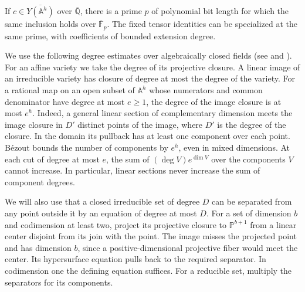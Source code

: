 \begin{lemma}\label{lem:descent-prime}
If $c\in\overline{Y(\mathbb A^h)}$ over $\overline{\mathbb Q}$, there is a
prime $p$ of polynomial bit length for which the same inclusion holds over
$\overline{\mathbb F}_p$. The fixed tensor identities can be specialized
at the same prime, with coefficients of bounded extension degree.
\end{lemma}

We use the following degree estimates over algebraically closed fields
(see \cite[Ch.~I, \S7]{Hartshorne} and
\cite[Lemma~2 and Proposition~3]{Heintz}).
For an affine variety we take the degree of its projective closure.
A linear image of an irreducible variety has closure of degree at most
the degree of the variety. For a rational map on an open subset of
$\mathbb A^h$ whose numerators and common denominator have degree at most
$e\ge1$, the degree of the image closure is at most $e^h$. Indeed, a
general linear section of complementary dimension meets the image closure
in $D'$ distinct points of the image, where $D'$ is the degree of the
closure. In the domain its pullback has at least one component over
each point. B\'ezout bounds the number
of components by $e^h$, even in mixed dimensions. At each cut of degree
at most $e$, the sum of $(\deg V)e^{\dim V}$ over the components $V$
cannot increase. In particular, linear sections never increase the sum
of component degrees.

We will also use that a closed irreducible set of degree $D$ can be
separated from any point outside it by an equation of degree at most $D$.
For a set of dimension $b$ and codimension at least two, project its
projective closure to $\mathbb P^{b+1}$ from a linear center disjoint from
its join with the point. The image misses the projected point and has
dimension $b$, since a positive-dimensional projective fiber would meet the
center. Its hypersurface equation pulls back to the required separator.
In codimension one the defining equation suffices. For a reducible set,
multiply the separators for its components.

